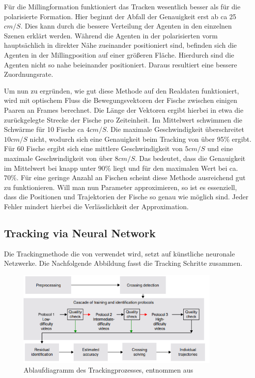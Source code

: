 Für die Millingformation funktioniert das Tracken wesentlich besser als für die polarisierte Formation.
Hier beginnt der Abfall der Genauigkeit erst ab ca 25 $cm/S$. Dies kann durch die bessere Verteilung der Agenten in den einzelnen Szenen erklärt werden. Während die Agenten in der polarisierten vorm hauptsächlich in direkter Nähe zueinander positioniert sind, befinden sich die Agenten in der Millingposition auf einer größeren Fläche. Hierdurch sind die Agenten nicht so nahe beieinander positioniert. Daraus resultiert eine bessere Zuordnungsrate.

Um nun zu ergründen, wie gut diese Methode auf den Realdaten funktioniert, wird mit optischem Fluss die Bewegungsvektoren der Fische zwischen einigen Paaren an Frames berechnet. Die Länge der Vektoren ergibt hierbei in etwa die zurückgelegte Strecke der Fische pro Zeiteinheit. Im Mittelwert schwimmen die Schwärme für 10 Fische ca $4 cm/S$. Die maximale Geschwindigkeit überschreitet $10 cm/S$ nicht, wodurch sich eine Genauigkeit beim Tracking von über 95\% ergibt. Für 60 Fische ergibt sich eine mittlere Geschwindigkeit von $5 cm/S$ und eine maximale Geschwindigkeit von über $8 cm/S$. Das bedeutet, dass die Genauigkeit im Mittelwert bei knapp unter $90\%$ liegt und für den maximalen Wert bei ca. $70\%$.
Für eine geringe Anzahl an Fischen scheint diese Methode ausreichend gut zu funktionieren. Will man nun Parameter approximieren, so ist es essenziell, dass die Positionen und Trajektorien der Fische so genau wie möglich sind.
Jeder Fehler mindert hierbei die Verlässlichkeit der Approximation.


\subsection{Tracking via Neural Network}
Die Trackingmethode die von \citet{DBLP:journals/corr/abs-1803-04351} verwendet wird, setzt auf künstliche neuronale Netzwerke. Die Nachfolgende Abbildung fasst die Tracking Schritte zusammen.

\begin{figure}[H]
\centering
\includegraphics[width=100mm]{figures/Experimente/Tracking/AblaufTrackinb.png} 
\caption{ Ablaufdiagramm des Trackingprozesses, entnommen aus \citet{DBLP:journals/corr/abs-1803-04351}\label{fig:Ablaufdiagramm}}
\end{figure}

